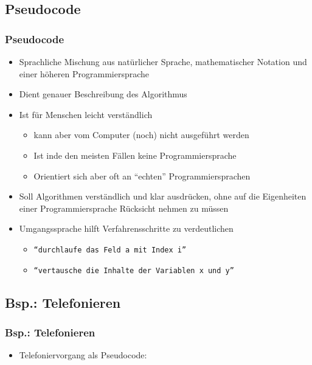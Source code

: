   \subsection{Pseudocode}
  \begin{frame}
      \frametitle{Pseudocode}
      \begin{itemize}
          \item Sprachliche Mischung aus natürlicher Sprache, mathematischer Notation und einer höheren Programmiersprache
          \item Dient genauer Beschreibung des Algorithmus
          \item Ist für Menschen leicht verständlich
          \begin{itemize}
              \item kann aber vom Computer (noch) nicht ausgeführt werden
              \item Ist inde den meisten Fällen keine Programmiersprache
              \item Orientiert sich aber oft an ``echten'' Programmiersprachen
          \end{itemize}
          \item Soll Algorithmen verständlich und klar ausdrücken, ohne auf die Eigenheiten einer Programmiersprache Rücksicht nehmen zu müssen
          \item Umgangssprache hilft Verfahrensschritte zu verdeutlichen
          \begin{itemize}
            \item \texttt{``durchlaufe das Feld a mit Index i''}
            \item \texttt{``vertausche die Inhalte der Variablen x und y''}
          \end{itemize}
      \end{itemize}
  \end{frame}

  \subsection{Bsp.: Telefonieren}
  \begin{frame}
      \frametitle{Bsp.: Telefonieren}
      \begin{itemize}
          \item Telefoniervorgang als Pseudocode:
      \end{itemize}
    \end{frame}

